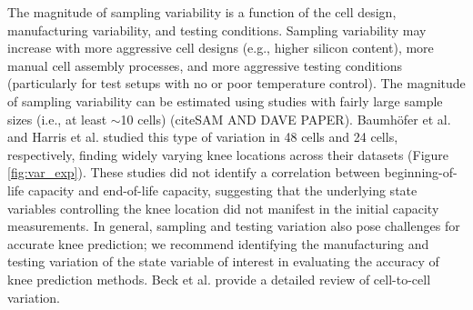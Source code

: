 \documentclass[journal=jpclcd,manuscript=article]{achemso}
\begin{document}
The magnitude of sampling variability is a function of the cell design, manufacturing variability, and testing conditions. Sampling variability may increase with more aggressive cell designs (e.g., higher silicon content), more manual cell assembly processes, and more aggressive testing conditions (particularly for test setups with no or poor temperature control). The magnitude of sampling variability can be estimated using studies with fairly large sample sizes (i.e., at least $\sim$10 cells) (cite{SAM AND DAVE PAPER}). Baumhöfer et al.\cite{baumhofer_production_2014} and Harris et al.\cite{harris_failure_2017} studied this type of variation in 48 cells and 24 cells, respectively, finding widely varying knee locations across their datasets (Figure \ref{fig:var_exp}). These studies did not identify a correlation between beginning-of-life capacity and end-of-life capacity, suggesting that the underlying state variables controlling the knee location did not manifest in the initial capacity measurements. In general, sampling and testing variation also pose challenges for accurate knee prediction; we recommend identifying the manufacturing and testing variation of the state variable of interest in evaluating the accuracy of knee prediction methods. Beck et al.\cite{beck_inhomogeneities_2021} provide a detailed review of cell-to-cell variation.
\end{document}
